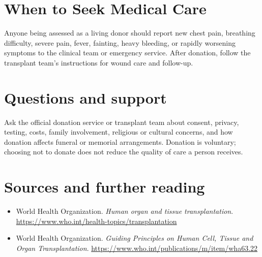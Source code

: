 \section*{When to Seek Medical Care}
Anyone being assessed as a living donor should report new chest pain, breathing difficulty, severe pain, fever, fainting, heavy bleeding, or rapidly worsening symptoms to the clinical team or emergency service. After donation, follow the transplant team’s instructions for wound care and follow-up.

\section*{Questions and support}
Ask the official donation service or transplant team about consent, privacy, testing, costs, family involvement, religious or cultural concerns, and how donation affects funeral or memorial arrangements. Donation is voluntary; choosing not to donate does not reduce the quality of care a person receives.

\section*{Sources and further reading}
\begin{itemize}
\item World Health Organization. \textit{Human organ and tissue transplantation}. \url{https://www.who.int/health-topics/transplantation}
\item World Health Organization. \textit{Guiding Principles on Human Cell, Tissue and Organ Transplantation}. \url{https://www.who.int/publications/m/item/wha63.22}
\end{itemize}
